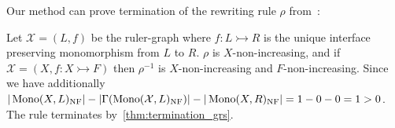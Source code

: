 \begin{example}
    \label{rem:d3:solution}  
    Our method can prove termination of the rewriting rule $\rho$ from~\cite[Example D.3]{endrullis2024generalized_arxiv_v2}:
    \begin{center}
    \end{center}
    Let $\mathcal{X} = (L,f)$ be the ruler-graph where $f:L \rightarrowtail R$ is the unique interface preserving monomorphism from $L$ to $R$. 
    $\rho$ is $X$-non-increasing, and if $\mathcal{X}= (X,f:X \rightarrowtail F)$ then $\rho^{-1}$ is $X$-non-increasing and $F$-non-increasing. 
    Since we have additionally $|\operatorname{Mono}(X,L)_{\operatorname{NF}}| - 
    |
        \Gamma(\operatorname{Mono}(\mathcal{X},L)_{\operatorname{NF}})
        | -
    |\operatorname{Mono}(X,R)_{\operatorname{NF}}|
    = 1 - 0 - 0 = 1 > 0$. The rule terminates by~\autoref{thm:termination_grs}.
  \end{example} 

